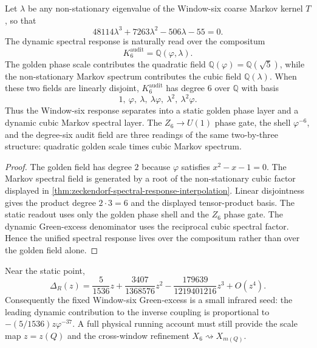 \begin{theorem}
\label{thm:zeckendorf-golden-markov-audit-field}
Let $\lambda$ be any non-stationary eigenvalue of the Window-six coarse
Markov kernel $T$, so that
$$
  48114\lambda^3+7263\lambda^2-506\lambda-55=0.
$$
The dynamic spectral response is naturally read over the compositum
$$
  K_6^{\mathrm{audit}}
  =
  \mathbb{Q}(\varphi,\lambda).
$$
The golden phase scale contributes the quadratic field
$\mathbb{Q}(\varphi)=\mathbb{Q}(\sqrt5)$, while the non-stationary Markov
spectrum contributes the cubic field $\mathbb{Q}(\lambda)$. When these
two fields are linearly disjoint, $K_6^{\mathrm{audit}}$ has degree $6$
over $\mathbb{Q}$ with basis
$$
  1,\ \varphi,\ \lambda,\ \lambda\varphi,\ \lambda^2,\ \lambda^2\varphi.
$$
Thus the Window-six response separates into a static golden phase layer
and a dynamic cubic Markov spectral layer. The $Z_6\to U(1)$ phase gate,
the shell $\varphi^{-6}$, and the degree-six audit field are three
readings of the same two-by-three structure: quadratic golden scale
times cubic Markov spectrum.
\end{theorem}
\begin{proof}
The golden field has degree $2$ because $\varphi$ satisfies
$x^2-x-1=0$. The Markov spectral field is generated by a root of the
non-stationary cubic factor displayed in
\autoref{thm:zeckendorf-spectral-response-interpolation}. Linear
disjointness gives the product degree $2\cdot3=6$ and the displayed
tensor-product basis. The static readout uses only the golden phase shell
and the $Z_6$ phase gate. The dynamic Green-excess denominator uses the
reciprocal cubic spectral factor. Hence the unified spectral response
lives over the compositum rather than over the golden field alone.
\end{proof}

\begin{corollary}
\label{cor:zeckendorf-small-activation-green-excess}
Near the static point,
$$
  \Delta_R(z)
  =
  \frac{5}{1536}z
  +
  \frac{3407}{1368576}z^2
  -
  \frac{179639}{1219401216}z^3
  +
  O(z^4).
$$
Consequently the fixed Window-six Green-excess is a small infrared seed:
the leading dynamic contribution to the inverse coupling is proportional
to $-(5/1536)z\varphi^{-37}$. A full physical running account must still
provide the scale map $z=z(Q)$ and the cross-window refinement
$X_6\rightsquigarrow X_{m(Q)}$.
\end{corollary}



